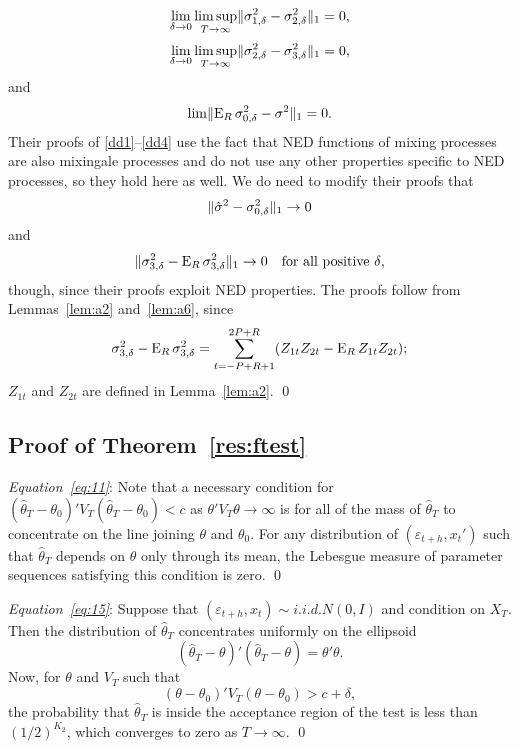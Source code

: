 \documentclass[11pt]{article}
\newcommand{\e}{\varepsilon}
\begin{document}
\begin{equation} \label{dd2}
\lim_{\delta\to0} \limsup_{T\to\infty} \lVert \sigma_{1,\delta}^2 - \sigma_{2,\delta}^{2}
\rVert_1 = 0,
\end{equation}
\begin{equation} \label{dd3}
\lim_{\delta\to0} \limsup_{T\to\infty} \lVert \sigma_{2,\delta}^{2} - \sigma_{3,\delta}^{2}
\rVert_1 = 0,
\end{equation}
and
\begin{equation} \label{dd4}
\lim \lVert \operatorname{E}_R \sigma_{0,\delta}^2 - \sigma^2 \rVert_1 = 0.
\end{equation}
Their proofs of \eqref{dd1}--\eqref{dd4} use the fact that NED
functions of mixing processes are also mixingale processes and do not
use any other properties specific to NED processes, so they hold
here as well.  We do need to modify their proofs that
\begin{equation}
  \label{eq:4} \lVert \hat{\sigma}^2 - \sigma_{0,\delta}^2 \rVert_1 \to 0
\end{equation}
and
\begin{equation}
  \label{eq:5} \lVert \sigma_{3,\delta}^{2} - \operatorname{E}_R \sigma_{3,\delta}^{2} \rVert_1
  \to 0 \quad \text{for all positive $\delta$},
\end{equation}
though, since their proofs exploit NED properties.  The proofs
follow from Lemmas~\ref{lem:a2} and~\ref{lem:a6}, since
\begin{equation*}
  \sigma_{3,\delta}^{2} - \operatorname{E}_R \sigma_{3,\delta}^{2} = \sum_{t=-P+R+1}^{2P+R} (Z_{1t}Z_{2t} - \operatorname{E}_R Z_{1t}Z_{2t});
\end{equation*}
$Z_{1t}$ and $Z_{2t}$ are defined in Lemma~\ref{lem:a2}.
\qed

\subsection*{Proof of Theorem~\ref{res:ftest}}

\textit{Equation~\eqref{eq:11}}: Note that a necessary condition for
$(\hat{\theta}_T - \theta_0)'V_T (\hat{\theta}_T - \theta_0) < c$
as $\theta'V_T\theta \to \infty$ is for all of the mass of
$\hat{\theta}_T$ to concentrate on the line joining $\theta$ and
$\theta_0$.  For any distribution of $(\e_{t+h}, x_t')$ such
that $\hat{\theta}_T$ depends on $\theta$ only through its mean, the
Lebesgue measure of parameter sequences satisfying this condition is
zero. \qed

\vspace{\baselineskip}
\noindent\textit{Equation~\eqref{eq:15}}:  Suppose that
$(\e_{t+h}, x_t) \sim i.i.d. N(0,I)$ and condition on $X_T$.
Then the distribution of $\hat{\theta}_{T}$ concentrates uniformly on
the ellipsoid
\begin{equation*}
  (\hat{\theta}_T - \theta)'(\hat{\theta}_T - \theta) = \theta'\theta.
\end{equation*}
Now, for $\theta$ and $V_T$ such that
\begin{equation*}
  (\theta-\theta_0)' V_T (\theta-\theta_0) > c + \delta,
\end{equation*}
the probability that $\hat{\theta}_T$ is inside the acceptance region
of the test is less than $(1/2)^{K_2}$, which converges to zero as $T
\to \infty$. \qed
\end{document}

